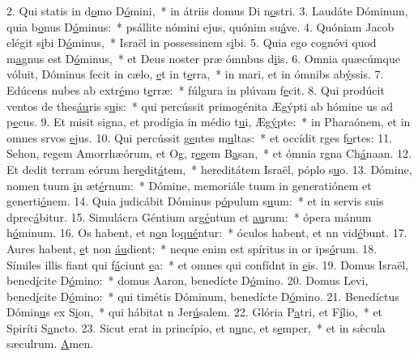 2. Qui statis in d\uline{o}mo D\uline{ó}mini,~* in átriis domus Di n\uline{o}stri.
3. Laudáte Dóminum, quia b\uline{o}nus D\uline{ó}minus:~* psállite nómini ejus, quónim su\uline{á}ve.
4. Quóniam Jacob elégit s\uline{i}bi D\uline{ó}minus,~* Israël in possessinem s\uline{i}bi.
5. Quia ego cognóvi quod m\uline{a}gnus est D\uline{ó}minus,~* et Deus noster præ ómnbus d\uline{i}is.
6. Omnia quæcúmque vóluit, Dóminus fecit in cælo, \uline{e}t in t\uline{e}rra,~* in mari, et in ómnibs ab\uline{ý}ssis.
7. Edúcens nubes ab extr\uline{é}mo t\uline{e}rræ:~* fúlgura in plúvam f\uline{e}cit.
8. Qui prodúcit ventos de thes\uline{áu}ris s\uline{u}is:~* qui percússit primogénita Ægýpti ab hómine us ad p\uline{e}cus.
9. Et misit signa, et prodígia in médio t\uline{u}i, Æg\uline{ý}pte:~* in Pharaónem, et in omnes srvos \uline{e}jus.
10. Qui percússit g\uline{e}ntes m\uline{u}ltas:~* et occídit rges f\uline{o}rtes:
11. Sehon, regem Amorrhæórum, et Og, r\uline{e}gem B\uline{a}san,~* et ómnia rgna Ch\uline{á}naan.
12. Et dedit terram eórum her\uline{e}dit\uline{á}tem,~* hereditátem Israël, póplo s\uline{u}o.
13. Dómine, nomen tuum \uline{i}n æt\uline{é}rnum:~* Dómine, memoriále tuum in generatiónem et generti\uline{ó}nem.
14. Quia judicábit Dóminus p\uline{ó}pulum s\uline{u}um:~* et in servis suis dprec\uline{á}bitur.
15. Simulácra Géntium arg\uline{é}ntum et \uline{au}rum:~* ópera mánum h\uline{ó}minum.
16. Os habent, et n\uline{o}n lo\uline{qué}ntur:~* óculos habent, et nn vid\uline{é}bunt.
17. Aures habent, \uline{e}t non \uline{áu}dient:~* neque enim est spíritus in or ips\uline{ó}rum.
18. Símiles illis fiant qui f\uline{á}ciunt \uline{e}a:~* et omnes qui confídnt in \uline{e}is.
19. Domus Israël, bened\uline{í}cite D\uline{ó}mino:~* domus Aaron, benedícte D\uline{ó}mino.
20. Domus Levi, bened\uline{í}cite D\uline{ó}mino:~* qui timétis Dóminum, benedícte D\uline{ó}mino.
21. Benedíctus Dómin\uline{u}s ex S\uline{i}on,~* qui hábitat n Jer\uline{ú}salem.
22. Glória P\uline{a}tri, et F\uline{í}lio,~* et Spiríti S\uline{a}ncto.
23. Sicut erat in princípio, et n\uline{u}nc, et s\uline{e}mper,~* et in sǽcula sæculrum. \uline{A}men.
